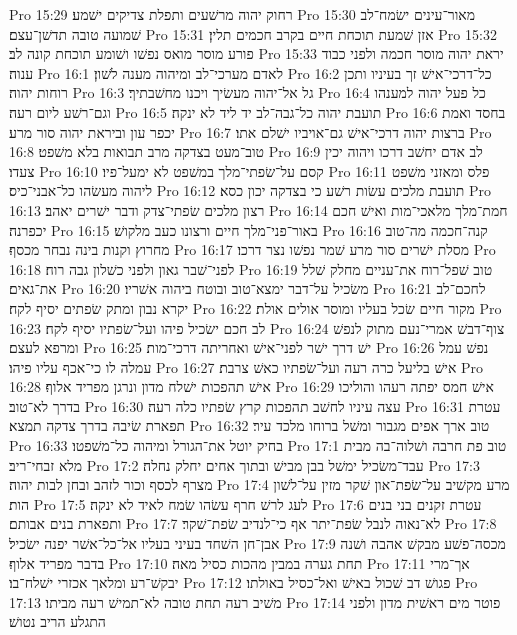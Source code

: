 Pro 15:29  רחוק יהוה מרשׁעים ותפלת צדיקים ישׁמע׃
Pro 15:30  מאור־עינים ישׂמח־לב שׁמועה טובה תדשׁן־עצם׃
Pro 15:31  אזן שׁמעת תוכחת חיים בקרב חכמים תלין׃
Pro 15:32  פורע מוסר מואס נפשׁו ושׁומע תוכחת קונה לב׃
Pro 15:33  יראת יהוה מוסר חכמה ולפני כבוד ענוה׃
Pro 16:1  לאדם מערכי־לב ומיהוה מענה לשׁון׃
Pro 16:2  כל־דרכי־אישׁ זך בעיניו ותכן רוחות יהוה׃
Pro 16:3  גל אל־יהוה מעשׂיך ויכנו מחשׁבתיך׃
Pro 16:4  כל פעל יהוה למענהו וגם־רשׁע ליום רעה׃
Pro 16:5  תועבת יהוה כל־גבה־לב יד ליד לא ינקה׃
Pro 16:6  בחסד ואמת יכפר עון וביראת יהוה סור מרע׃
Pro 16:7  ברצות יהוה דרכי־אישׁ גם־אויביו ישׁלם אתו׃
Pro 16:8  טוב־מעט בצדקה מרב תבואות בלא משׁפט׃
Pro 16:9  לב אדם יחשׁב דרכו ויהוה יכין צעדו׃
Pro 16:10  קסם על־שׂפתי־מלך במשׁפט לא ימעל־פיו׃
Pro 16:11  פלס ומאזני משׁפט ליהוה מעשׂהו כל־אבני־כיס׃
Pro 16:12  תועבת מלכים עשׂות רשׁע כי בצדקה יכון כסא׃
Pro 16:13  רצון מלכים שׂפתי־צדק ודבר ישׁרים יאהב׃
Pro 16:14  חמת־מלך מלאכי־מות ואישׁ חכם יכפרנה׃
Pro 16:15  באור־פני־מלך חיים ורצונו כעב מלקושׁ׃
Pro 16:16  קנה־חכמה מה־טוב מחרוץ וקנות בינה נבחר מכסף׃
Pro 16:17  מסלת ישׁרים סור מרע שׁמר נפשׁו נצר דרכו׃
Pro 16:18  לפני־שׁבר גאון ולפני כשׁלון גבה רוח׃
Pro 16:19  טוב שׁפל־רוח את־עניים מחלק שׁלל את־גאים׃
Pro 16:20  משׂכיל על־דבר ימצא־טוב ובוטח ביהוה אשׁריו׃
Pro 16:21  לחכם־לב יקרא נבון ומתק שׂפתים יסיף לקח׃
Pro 16:22  מקור חיים שׂכל בעליו ומוסר אולים אולת׃
Pro 16:23  לב חכם ישׂכיל פיהו ועל־שׂפתיו יסיף לקח׃
Pro 16:24  צוף־דבשׁ אמרי־נעם מתוק לנפשׁ ומרפא לעצם׃
Pro 16:25  ישׁ דרך ישׁר לפני־אישׁ ואחריתה דרכי־מות׃
Pro 16:26  נפשׁ עמל עמלה לו כי־אכף עליו פיהו׃
Pro 16:27  אישׁ בליעל כרה רעה ועל־שׂפתיו כאשׁ צרבת׃
Pro 16:28  אישׁ תהפכות ישׁלח מדון ונרגן מפריד אלוף׃
Pro 16:29  אישׁ חמס יפתה רעהו והוליכו בדרך לא־טוב׃
Pro 16:30  עצה עיניו לחשׁב תהפכות קרץ שׂפתיו כלה רעה׃
Pro 16:31  עטרת תפארת שׂיבה בדרך צדקה תמצא׃
Pro 16:32  טוב ארך אפים מגבור ומשׁל ברוחו מלכד עיר׃
Pro 16:33  בחיק יוטל את־הגורל ומיהוה כל־משׁפטו׃
Pro 17:1  טוב פת חרבה ושׁלוה־בה מבית מלא זבחי־ריב׃
Pro 17:2  עבד־משׂכיל ימשׁל בבן מבישׁ ובתוך אחים יחלק נחלה׃
Pro 17:3  מצרף לכסף וכור לזהב ובחן לבות יהוה׃
Pro 17:4  מרע מקשׁיב על־שׂפת־און שׁקר מזין על־לשׁון הות׃
Pro 17:5  לעג לרשׁ חרף עשׂהו שׂמח לאיד לא ינקה׃
Pro 17:6  עטרת זקנים בני בנים ותפארת בנים אבותם׃
Pro 17:7  לא־נאוה לנבל שׂפת־יתר אף כי־לנדיב שׂפת־שׁקר׃
Pro 17:8  אבן־חן השׁחד בעיני בעליו אל־כל־אשׁר יפנה ישׂכיל׃
Pro 17:9  מכסה־פשׁע מבקשׁ אהבה ושׁנה בדבר מפריד אלוף׃
Pro 17:10  תחת גערה במבין מהכות כסיל מאה׃
Pro 17:11  אך־מרי יבקשׁ־רע ומלאך אכזרי ישׁלח־בו׃
Pro 17:12  פגושׁ דב שׁכול באישׁ ואל־כסיל באולתו׃
Pro 17:13  משׁיב רעה תחת טובה לא־תמישׁ רעה מביתו׃
Pro 17:14  פוטר מים ראשׁית מדון ולפני התגלע הריב נטושׁ׃
